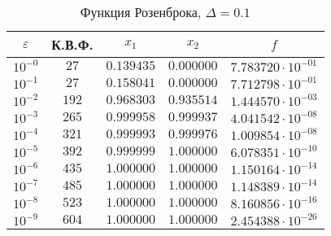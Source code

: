 \documentclass[a4paper,12pt,notitlepage,pdftex,headsepline]{scrartcl}
\begin{document}
        \begin{table}[ht]
          \centering
          \caption{Функция Розенброка, $\Delta = 0.1$}
          \begin{tabular}{|c|c|c|c|c|}
            \hline
            $\varepsilon$ & К.В.Ф. & $x_1$ & $x_2$ & $f$\\
            \hline
            $10^{-0}$ & $27$ & $0.139435$ & $0.000000$ & $7.783720\cdot 10^{-01}$\\
            $10^{-1}$ & $27$ & $0.158041$ & $0.000000$ & $7.712798\cdot 10^{-01}$\\
            $10^{-2}$ & $192$ & $0.968303$ & $0.935514$ & $1.444570\cdot 10^{-03}$\\
            $10^{-3}$ & $265$ & $0.999958$ & $0.999937$ & $4.041542\cdot 10^{-08}$\\
            $10^{-4}$ & $321$ & $0.999993$ & $0.999976$ & $1.009854\cdot 10^{-08}$\\
            $10^{-5}$ & $392$ & $0.999999$ & $1.000000$ & $6.078351\cdot 10^{-10}$\\
            $10^{-6}$ & $435$ & $1.000000$ & $1.000000$ & $1.150164\cdot 10^{-14}$\\
            $10^{-7}$ & $485$ & $1.000000$ & $1.000000$ & $1.148389\cdot 10^{-14}$\\
            $10^{-8}$ & $523$ & $1.000000$ & $1.000000$ & $8.160856\cdot 10^{-16}$\\
            $10^{-9}$ & $604$ & $1.000000$ & $1.000000$ & $2.454388\cdot 10^{-26}$\\
            \hline
          \end{tabular}
        \end{table}
\end{document}
